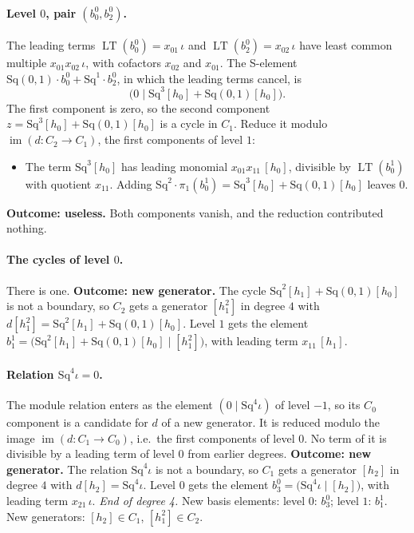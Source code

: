 \documentclass[11pt]{article}
\newcommand{\Sq}{\mathrm{Sq}}
\DeclareMathOperator{\LT}{LT}
\begin{document}
\paragraph{Level $0$, pair $(b^{0}_{0}, b^{0}_{2})$.} The leading terms $\LT(b^{0}_{0}) = x_{01}\,\iota$ and $\LT(b^{0}_{2}) = x_{02}\,\iota$ have least common multiple $x_{01}x_{02}\,\iota$, with cofactors $x_{02}$ and $x_{01}$. The S-element $\Sq(0,1)\cdot b^{0}_{0} + \Sq^{1}\cdot b^{0}_{2}$, in which the leading terms cancel, is
\[\bigl(0 \;\big|\; \Sq^{3}[h_0] + \Sq(0,1)[h_0]\bigr).\]
The first component is zero, so the second component $z = \Sq^{3}[h_0] + \Sq(0,1)[h_0]$ is a cycle in $C_{1}$.
Reduce it modulo $\operatorname{im}(d\colon C_{2}\to C_{1})$, the first components of level $1$:
\begin{itemize}
\item The term $\Sq^{3}[h_0]$ has leading monomial $x_{01}x_{11}\,[h_0]$, divisible by $\LT(b^{1}_{0})$ with quotient $x_{11}$. Adding $\Sq^{2}\cdot \pi_1(b^{1}_{0}) = \Sq^{3}[h_0] + \Sq(0,1)[h_0]$ leaves $0$.
\end{itemize}
\textbf{Outcome: useless.} Both components vanish, and the reduction contributed nothing.
\medskip
\paragraph{The cycles of level $0$.} There is one.
\textbf{Outcome: new generator.} The cycle $\Sq^{2}[h_1] + \Sq(0,1)[h_0]$ is not a boundary, so $C_{2}$ gets a generator $[h_1^2]$ in degree $4$ with $d[h_1^2] = \Sq^{2}[h_1] + \Sq(0,1)[h_0]$.
Level $1$ gets the element $b^{1}_{1} = \bigl(\Sq^{2}[h_1] + \Sq(0,1)[h_0] \;\big|\; [h_1^2]\bigr)$, with leading term $x_{11}\,[h_1]$.
\medskip
\paragraph{Relation $\Sq^{4}\iota = 0$.} The module relation enters as the element $(0 \mid \Sq^{4}\iota)$ of level $-1$, so its $C_0$ component is a candidate for $d$ of a new generator. It is reduced modulo the image $\operatorname{im}(d\colon C_1\to C_0)$, i.e.\ the first components of level $0$.
No term of it is divisible by a leading term of level $0$ from earlier degrees.
\textbf{Outcome: new generator.} The relation $\Sq^{4}\iota$ is not a boundary, so $C_{1}$ gets a generator $[h_2]$ in degree $4$ with $d[h_2] = \Sq^{4}\iota$.
Level $0$ gets the element $b^{0}_{3} = \bigl(\Sq^{4}\iota \;\big|\; [h_2]\bigr)$, with leading term $x_{21}\,\iota$.
\medskip\noindent\emph{End of degree 4.} New basis elements: level $0$: $b^{0}_{3}$; level $1$: $b^{1}_{1}$. New generators: $[h_2]\in C_{1}$, $[h_1^2]\in C_{2}$.
\end{document}
